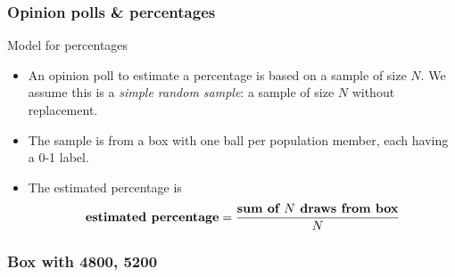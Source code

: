 \documentclass[handout]{beamer}
\begin{document}

   \begin{frame} \frametitle{Opinion polls \& percentages}

   \begin{block}
   {Model for percentages}
   \begin{itemize}
   \item An opinion poll to estimate a percentage
   is based on a sample of size $N$. We assume this is
   a {\em simple random sample}: a sample of size $N$ without replacement.

   \item The sample is from a box with one ball per population member,
   each having a 0-1 label.

   \item The estimated percentage is
   $$
   \text{\bf estimated percentage} = \frac{\text{\bf sum of $N$ draws from box}}{N}
   $$
   \end{itemize}
   \end{block}
   \end{frame}



   \begin{frame}
   \frametitle{Box with {\color{red} 4800}, {\color{blue} 5200}}
   \begin{center}
   \end{center}

   \end{frame}
\end{document}
